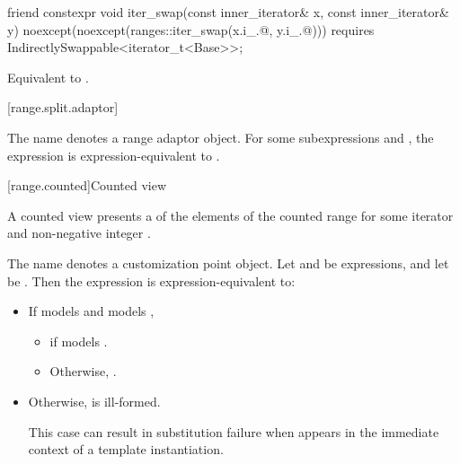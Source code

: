 %
\begin{itemdecl}
friend constexpr void iter_swap(const inner_iterator& x, const inner_iterator& y)
  noexcept(noexcept(ranges::iter_swap(x.i_.@, y.i_.@)))
  requires IndirectlySwappable<iterator_t<Base>>;
\end{itemdecl}

\begin{itemdescr}
\pnum
\effects Equivalent to
.
\end{itemdescr}

[range.split.adaptor]{}

\pnum
The name  denotes a
range adaptor object.
For some subexpressions  and ,
the expression  is expression-equivalent to
.


[range.counted]{Counted view}

\pnum
A counted view presents a  of the elements
of the counted range 
for some iterator  and non-negative integer .

\pnum
The name  denotes a
customization point object.
Let  and  be expressions,
and let  be .
Then the expression  is expression-equivalent to:

\begin{itemize}
\item If  models  and
   models ,
  \begin{itemize}
  \item {}
    if  models .
  \item Otherwise,
    .
\end{itemize}

\item Otherwise,  is ill-formed.
  \begin{note}
  This case can result in substitution failure when 
  appears in the immediate context of a template instantiation.
  \end{note}
\end{itemize}

